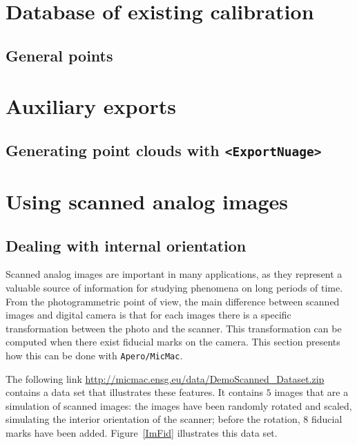 
\section{Database of existing calibration}

\label{DB:Calib}
\subsection{General points}


\section{Auxiliary exports}


\subsection{Generating point clouds with {\tt <ExportNuage>}}

\label{Ap:Exp:Nuage}



\section{Using scanned analog images}

\subsection{Dealing with internal orientation}

\label{Analog:Image}
Scanned analog images are important in many applications, as they represent
a valuable source of information for studying phenomena on long periods of time.
From the photogrammetric point of view, the main difference between
scanned images and digital camera is that for each images there
is a specific  transformation between the photo and the scanner.
This transformation can be computed when there exist fiducial marks
on the camera. This section presents how this can be done with {\tt Apero/MicMac}.


The following link \url{http://micmac.ensg.eu/data/DemoScanned_Dataset.zip} contains a data set that illustrates these
features. It contains $5$ images that are a simulation of scanned
images: the images have been randomly rotated and scaled, simulating the
interior orientation of the scanner; before the rotation, $8$  fiducial marks have
been added. Figure~\ref{ImFid} illustrates this data set.


